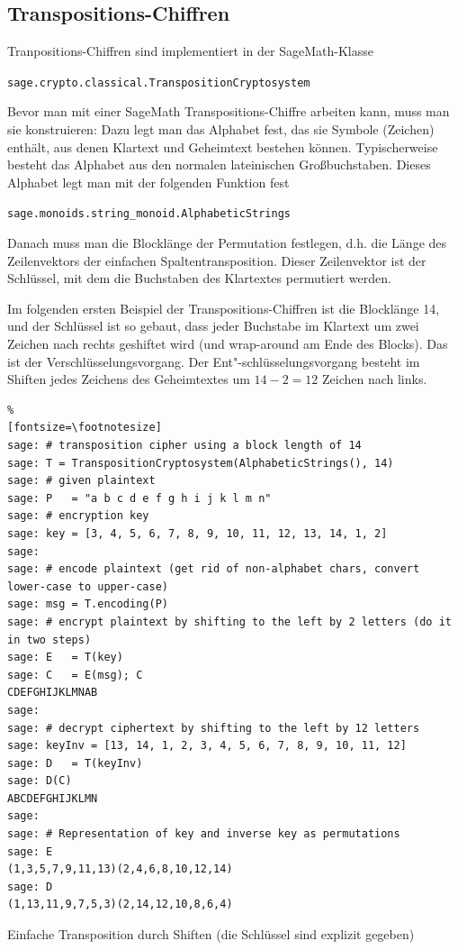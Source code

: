 \begin{refsegment}
\subsection{Transpositions-Chiffren}

Tranpositions-Chiffren sind implementiert in der SageMath-Klasse
\begin{center}
\verb!sage.crypto.classical.TranspositionCryptosystem!
\end{center}
Bevor man mit einer SageMath Transpositions-Chiffre arbeiten kann, muss man sie
konstruieren: Dazu legt man das Alphabet fest, das sie Symbole (Zeichen) enthält,
aus denen Klartext und Geheimtext bestehen können.
Typischerweise besteht das Alphabet aus den normalen lateinischen Großbuchstaben.
Dieses Alphabet legt man mit der folgenden Funktion fest
\begin{center}
\verb!sage.monoids.string_monoid.AlphabeticStrings!
\end{center}
Danach muss man die Blocklänge der Permutation festlegen, d.h. die
Länge des Zeilenvektors der einfachen Spaltentransposition.
Dieser Zeilenvektor ist der Schlüssel, mit dem die Buchstaben des
Klartextes permutiert werden.

Im folgenden ersten Beispiel der Transpositions-Chiffren ist die
Blocklänge 14, und der Schlüssel ist so gebaut, dass jeder Buchstabe
im Klartext um zwei Zeichen nach rechts geshiftet wird (und wrap-around
am Ende des Blocks). Das ist der Verschlüsselungsvorgang.
Der Ent"-schlüsselungsvorgang besteht im Shiften jedes Zeichens des
Geheimtextes um $14 - 2 = 12$ Zeichen nach links.

\begin{sagecode}
\begin{Verbatim}%
[fontsize=\footnotesize]
sage: # transposition cipher using a block length of 14
sage: T = TranspositionCryptosystem(AlphabeticStrings(), 14)
sage: # given plaintext
sage: P   = "a b c d e f g h i j k l m n"
sage: # encryption key
sage: key = [3, 4, 5, 6, 7, 8, 9, 10, 11, 12, 13, 14, 1, 2]
sage:
sage: # encode plaintext (get rid of non-alphabet chars, convert lower-case to upper-case)
sage: msg = T.encoding(P)
sage: # encrypt plaintext by shifting to the left by 2 letters (do it in two steps)
sage: E   = T(key)
sage: C   = E(msg); C
CDEFGHIJKLMNAB
sage:
sage: # decrypt ciphertext by shifting to the left by 12 letters
sage: keyInv = [13, 14, 1, 2, 3, 4, 5, 6, 7, 8, 9, 10, 11, 12]
sage: D   = T(keyInv)
sage: D(C)
ABCDEFGHIJKLMN
sage:
sage: # Representation of key and inverse key as permutations
sage: E
(1,3,5,7,9,11,13)(2,4,6,8,10,12,14)
sage: D
(1,13,11,9,7,5,3)(2,14,12,10,8,6,4)
\end{Verbatim}
\caption{Einfache Transposition durch Shiften (die Schlüssel sind explizit gegeben)}
\end{sagecode}


\end{refsegment}
